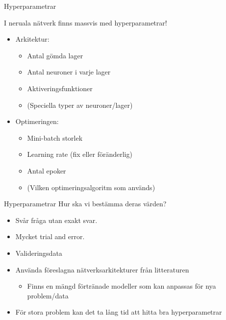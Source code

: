 \documentclass[10pt,english]{beamer}
\begin{document}
\begin{frame}{Hyperparametrar}
    
    I neruala nätverk finns massvis med hyperparametrar!
    \begin{itemize}
        \item Arkitektur:
        \begin{itemize}
            \item Antal gömda lager
            \item Antal neuroner i varje lager
            \item Aktiveringsfunktioner
            \item (Speciella typer av neuroner/lager)
        \end{itemize}
        \item Optimeringen:
        \begin{itemize}
            \item Mini-batch storlek
            \item Learning rate (fix eller föränderlig)
            \item Antal epoker
            \item (Vilken optimeringsalgoritm som används)
        \end{itemize}
    \end{itemize}

\end{frame}

\begin{frame}{Hyperparametrar}
    Hur ska vi bestämma deras värden?
    \begin{itemize}
        \item Svår fråga utan exakt svar.
        \item Mycket trial and error.
        \item Valideringsdata
        \item Använda föreslagna nätverksarkitekturer från litteraturen
        \begin{itemize}
          \item Finns en mängd förtränade modeller som kan anpassas för nya problem/data
        \end{itemize}
        \item För stora problem kan det ta lång tid att hitta bra hyperparametrar
    \end{itemize}
\end{frame}
\end{document}

